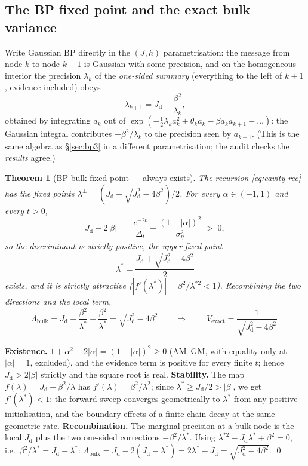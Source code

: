 \documentclass[11pt]{article}
\newtheorem{theorem}[proposition]{Theorem}
\theoremstyle{definition}
\newcommand{\Dt}{\Delta_t}
\newcommand{\Jd}{J_{\mathrm d}}
\begin{document}
\subsection{The BP fixed point and the exact bulk variance}

Write Gaussian BP directly in the $(J,h)$ parametrisation: the message from
node $k$ to node $k{+}1$ is Gaussian with some precision, and on the
homogeneous interior the precision $\lambda_k$ of the \emph{one-sided summary}
(everything to the left of $k{+}1$, evidence included) obeys
\begin{equation}\label{eq:cavity-rec}
  \lambda_{k+1}=\Jd-\frac{\beta^2}{\lambda_k},
\end{equation}
obtained by integrating $a_k$ out of
$\exp(-\tfrac12\lambda_ka_k^2+\theta_ka_k-\beta a_ka_{k+1}-\dots)$: the
Gaussian integral contributes $-\beta^2/\lambda_k$ to the precision seen by
$a_{k+1}$. (This is the same algebra as \S\ref{sec:bp3} in a different
parametrisation; the audit checks the \emph{results} agree.)

\begin{theorem}[BP bulk fixed point --- always exists]\label{thm:bp-bulk}
The recursion \eqref{eq:cavity-rec} has the fixed points
$\lambda^\pm=(\Jd\pm\sqrt{\Jd^2-4\beta^2})/2$. For every $\alpha\in(-1,1)$ and
every $t>0$,
\[
  \Jd-2|\beta|\;=\;\frac{e^{-2t}}{\Dt}+\frac{(1-|\alpha|)^2}{\sigma_\eta^2}\;>\;0,
\]
so the discriminant is strictly positive, the upper fixed point
\begin{equation}\label{eq:bp-fixed}
  \boxed{\ \lambda^\ast=\frac{\Jd+\sqrt{\Jd^2-4\beta^2}}{2}\ }
\end{equation}
exists, and it is strictly attractive
($|f'(\lambda^\ast)|=\beta^2/\lambda^{\ast2}<1$). Recombining the two
directions and the local term,
\begin{equation}\label{eq:bulk-var}
  \Lambda_{\mathrm{bulk}}
  =\Jd-\frac{\beta^2}{\lambda^\ast}-\frac{\beta^2}{\lambda^\ast}
  =\sqrt{\Jd^2-4\beta^2}
  \qquad\Longrightarrow\qquad
  \boxed{\ V_{\mathrm{exact}}=\frac{1}{\sqrt{\Jd^2-4\beta^2}}\ }
\end{equation}
\end{theorem}

\begin{derivation}[\ref*{thm:bp-bulk}]
\textbf{Existence.} $1+\alpha^2-2|\alpha|=(1-|\alpha|)^2\ge0$ (AM--GM, with
equality only at $|\alpha|=1$, excluded), and the evidence term is positive
for every finite $t$; hence $\Jd>2|\beta|$ strictly and the square root is
real. \textbf{Stability.} The map $f(\lambda)=\Jd-\beta^2/\lambda$ has
$f'(\lambda)=\beta^2/\lambda^2$; since
$\lambda^\ast\ge\Jd/2>|\beta|$, we get $f'(\lambda^\ast)<1$: the forward sweep
converges geometrically to $\lambda^\ast$ from any positive initialisation,
and the boundary effects of a finite chain decay at the same geometric rate.
\textbf{Recombination.} The marginal precision at a bulk node is the local
$\Jd$ plus the two one-sided corrections $-\beta^2/\lambda^\ast$. Using
$\lambda^{\ast2}-\Jd\lambda^\ast+\beta^2=0$, i.e.\
$\beta^2/\lambda^\ast=\Jd-\lambda^\ast$:
$\Lambda_{\mathrm{bulk}}=\Jd-2(\Jd-\lambda^\ast)=2\lambda^\ast-\Jd
=\sqrt{\Jd^2-4\beta^2}$. \qed
\end{derivation}
\end{document}

